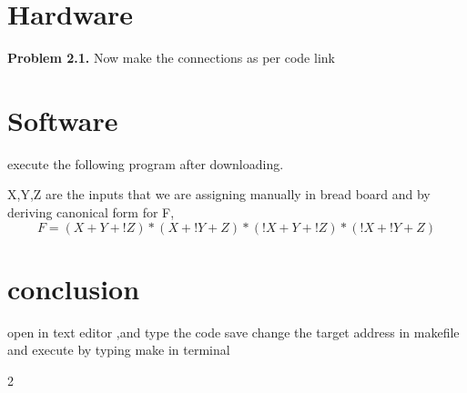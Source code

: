 \documentclass{article}
\begin{document}
\begin{multicols}{2}
    \label{table1}

\section{Hardware}

\textbf{Problem 2.1.} Now make the connections as per
code link 



\section{Software}
execute the following program after
downloading.
\vspace{10mm}

X,Y,Z are the inputs that we are assigning manually in bread board and by deriving canonical form for F,
\begin{equation}
F=(X+Y+!Z)*(X+!Y+Z)*(!X+Y+!Z)*(!X+!Y+Z)
\end{equation}
\section{conclusion}
open in text editor ,and type the code save
change the target address in makefile
and execute by typing make in terminal

\end{multicols}{2}
\end{document}

